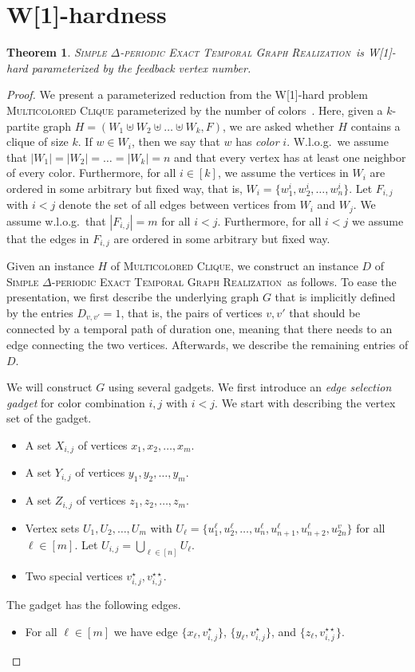 \documentclass[11pt,a4paper]{article}
\newtheorem{theorem}{Theorem}
\theoremstyle{remark}
\theoremstyle{definition}
\newcommand{\deltaExactLong}{\textsc{Simple $\Delta$-periodic Exact Temporal Graph Realization}}
\begin{document}
\section{W[1]-hardness}
\begin{theorem}\label{thm:W1wrtFVS}
    \deltaExactLong\ is W[1]-hard parameterized by the feedback vertex number.
\end{theorem}
\begin{proof}
    We present a parameterized reduction from the W[1]-hard problem \textsc{Multicolored Clique} parameterized by the number of colors~\cite{fellows2009multipleinterval}.  Here, given a $k$-partite graph $H=(W_1\uplus W_2 \uplus\ldots\uplus W_k, F)$, we are asked whether $H$ contains a clique of size $k$. If $w\in W_i$, then we say that $w$ has \emph{color} $i$. W.l.o.g.\ we assume that $|W_1|=|W_2|=\ldots=|W_k|=n$ and that every vertex has at least one neighbor of every color. 
    Furthermore, for all $i\in[k]$, we assume the vertices in $W_i$ are ordered in some arbitrary but fixed way, that is, $W_i=\{w^i_1,w^i_2,\ldots,w^i_n\}$.
    Let $F_{i,j}$ with $i<j$ denote the set of all edges between vertices from $W_i$ and $W_j$. We assume w.l.o.g.\ that $|F_{i,j}|=m$ for all $i< j$.
    Furthermore, for all $i<j$ we assume that the edges in $F_{i,j}$ are ordered in some arbitrary but fixed way.

    Given an instance $H$ of \textsc{Multicolored Clique}, we construct an instance $D$ of \deltaExactLong\ as follows. To ease the presentation, we first describe the underlying graph $G$ that is implicitly defined by the entries $D_{v,v'}=1$, that is, the pairs of vertices $v,v'$ that should be connected by a temporal path of duration one, meaning that there needs to an edge connecting the two vertices. Afterwards, we describe the remaining entries of $D$.

    We will construct $G$ using several gadgets. We first introduce an \emph{edge selection gadget} for color combination $i,j$ with $i<j$. We start with describing the vertex set of the gadget.
    \begin{itemize}
        \item A set $X_{i,j}$ of vertices $x_1, x_2, \ldots, x_m$.
        \item A set $Y_{i,j}$ of vertices $y_1, y_2, \ldots, y_m$.
        \item A set $Z_{i,j}$ of vertices $z_1, z_2, \ldots, z_m$.
        \item Vertex sets $U_1, U_2, \ldots, U_m$ with $U_\ell=\{u^\ell_1, u^\ell_2,\ldots, u^\ell_n, u^\ell_{n+1}, u^\ell_{n+2}, u^v_{2n}\}$ for all $\ell\in[m]$. Let $U_{i,j}=\bigcup_{\ell\in[n]} U_\ell$.
        \item Two special vertices $v_{i,j}^\star,v_{i,j}^{\star\star}$.
    \end{itemize}
    The gadget has the following edges.
    \begin{itemize}
        \item For all $\ell\in [m]$ we have edge $\{x_\ell,v_{i,j}^\star\}$, $\{y_\ell,v_{i,j}^\star\}$, and $\{z_\ell,v_{i,j}^{\star\star}\}$. 


\end{itemize}
\end{proof}
\end{document}
